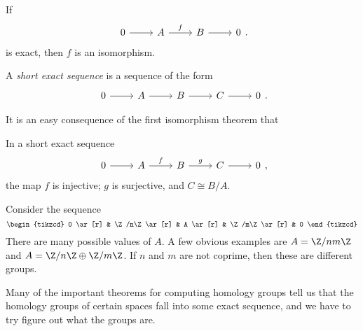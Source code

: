 \documentclass[a4paper]{article}
\theoremstyle{definition}
\begin{document}
\begin{eg}
  If
  \[
    \begin{tikzcd}
      0 \ar[r] & A \ar[r, "f"] & B \ar[r] & 0
    \end{tikzcd}.
  \]
  is exact, then $f$ is an isomorphism.
\end{eg}

\begin{defi}
  A \emph{short exact sequence} is a sequence of the form
  \[
    \begin{tikzcd}
      0 \ar[r] & A \ar[r] & B \ar[r] & C \ar[r] & 0
    \end{tikzcd}.
  \]
\end{defi}
It is an easy consequence of the first isomorphism theorem that
\begin{lemma}
  In a short exact sequence
  \[
    \begin{tikzcd}
      0 \ar[r] & A \ar[r, "f"] & B \ar[r, "g"] & C \ar[r] & 0
    \end{tikzcd},
  \]
  the map $f$ is injective; $g$ is surjective, and $C \cong B/A$.
\end{lemma}

\begin{eg}
  Consider the sequence
  \[
    \begin{tikzcd}
      0 \ar[r] & \Z/n\Z \ar[r] & A \ar[r] & \Z/m\Z \ar[r] & 0
    \end{tikzcd}
  \]
  There are many possible values of $A$. A few obvious examples are $A = \Z/nm\Z$ and $A = \Z/n\Z \oplus \Z/m\Z$. If $n$ and $m$ are not coprime, then these are different groups.
\end{eg}
Many of the important theorems for computing homology groups tell us that the homology groups of certain spaces fall into some exact sequence, and we have to try figure out what the groups are.
\end{document}
